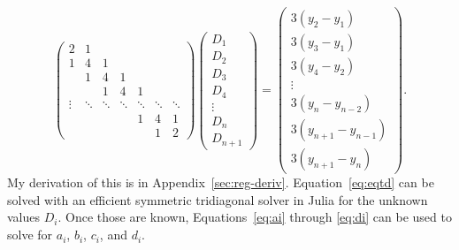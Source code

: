 \documentclass{scrartcl}
\begin{document}
\begin{equation}
\left(\begin{array}{ccccccc}
2&1\\
1&4&1\\
&1&4&1\\
&&1&4&1\\
\vdots&\ddots&\ddots&\ddots&\ddots&\ddots&\ddots\\
&&&&1&4&1\\
&&&&&1&2
\end{array}\right)
\left(\begin{array}{c}
D_1\\D_2\\D_3\\D_4\\ \vdots\\D_n\\D_{n+1}
\end{array}\right) =
\left(\begin{array}{c}
3(y_2-y_1)\\
3(y_3-y_1)\\
3(y_4-y_2)\\
\vdots\\
3(y_n-y_{n-2})\\
3(y_{n+1}-y_{n-1})\\
3(y_{n+1}-y_n)
\end{array}\right).\label{eq:eqtd}
\end{equation}
My derivation of this is in Appendix~\ref{sec:reg-deriv}.
Equation~\ref{eq:eqtd} can be solved with an efficient symmetric
tridiagonal solver in Julia for the unknown values $D_i$. Once those
are known, Equations~\ref{eq:ai} through \ref{eq:di} can be used
to solve for $a_i$, $b_i$, $c_i$, and $d_i$.
\end{document}

